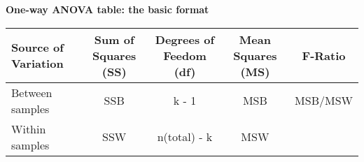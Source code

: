 \documentclass[]{book}
\theoremstyle{definition}
\theoremstyle{definition}
\theoremstyle{definition}
\theoremstyle{remark}
\begin{document}
\textbf{One-way ANOVA table: the basic format}

\begin{longtable}[]{@{}lcccc@{}}
\toprule
\begin{minipage}[b]{0.19\columnwidth}\raggedright
Source of Variation\strut
\end{minipage} & \begin{minipage}[b]{0.19\columnwidth}\centering
Sum of Squares (SS)\strut
\end{minipage} & \begin{minipage}[b]{0.22\columnwidth}\centering
Degrees of Feedom (df)\strut
\end{minipage} & \begin{minipage}[b]{0.17\columnwidth}\centering
Mean Squares (MS)\strut
\end{minipage} & \begin{minipage}[b]{0.08\columnwidth}\centering
F-Ratio\strut
\end{minipage}\tabularnewline
\midrule
\endhead
\begin{minipage}[t]{0.19\columnwidth}\raggedright
Between samples\strut
\end{minipage} & \begin{minipage}[t]{0.19\columnwidth}\centering
SSB\strut
\end{minipage} & \begin{minipage}[t]{0.22\columnwidth}\centering
k - 1\strut
\end{minipage} & \begin{minipage}[t]{0.17\columnwidth}\centering
MSB\strut
\end{minipage} & \begin{minipage}[t]{0.08\columnwidth}\centering
MSB/MSW\strut
\end{minipage}\tabularnewline
\begin{minipage}[t]{0.19\columnwidth}\raggedright
Within samples\strut
\end{minipage} & \begin{minipage}[t]{0.19\columnwidth}\centering
SSW\strut
\end{minipage} & \begin{minipage}[t]{0.22\columnwidth}\centering
n(total) - k\strut
\end{minipage} & \begin{minipage}[t]{0.17\columnwidth}\centering
MSW\strut
\end{minipage} & \begin{minipage}[t]{0.08\columnwidth}\centering
\strut
\end{minipage}\tabularnewline

\end{longtable}
\end{document}
